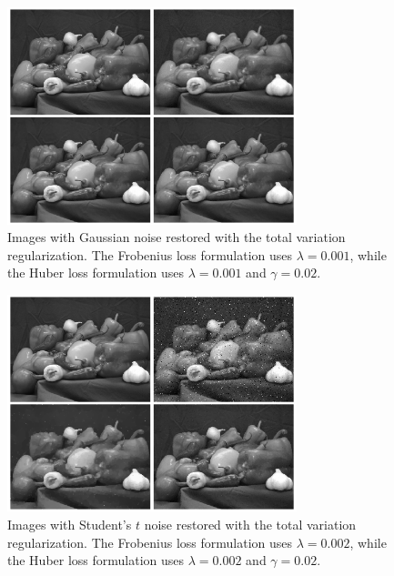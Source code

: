 \documentclass[10pt,a4paper]{article}
\begin{document}
	\begin{figure}[H]
		\begin{center}
			\includegraphics[width = 0.75\textwidth]{../figures/gaussian_peppers.png} 
		\end{center}
		\caption{Images with Gaussian noise restored with the total variation regularization. The Frobenius loss formulation uses $\lambda = 0.001$, while the Huber loss formulation uses $\lambda = 0.001$ and $\gamma = 0.02$.}
		\label{tv_gauss}
	\end{figure}
	\vspace{-1ex}
	\begin{figure}[H]
		\begin{center}
			\includegraphics[width = 0.75\textwidth]{../figures/student-t_peppers.png} 
		\end{center}
		\caption{Images with Student's $t$ noise restored with the total variation regularization. The Frobenius loss formulation uses $\lambda = 0.002$, while the Huber loss formulation uses $\lambda = 0.002$ and $\gamma = 0.02$. }
		\label{tv_student}
	\end{figure}
	
\end{document}
